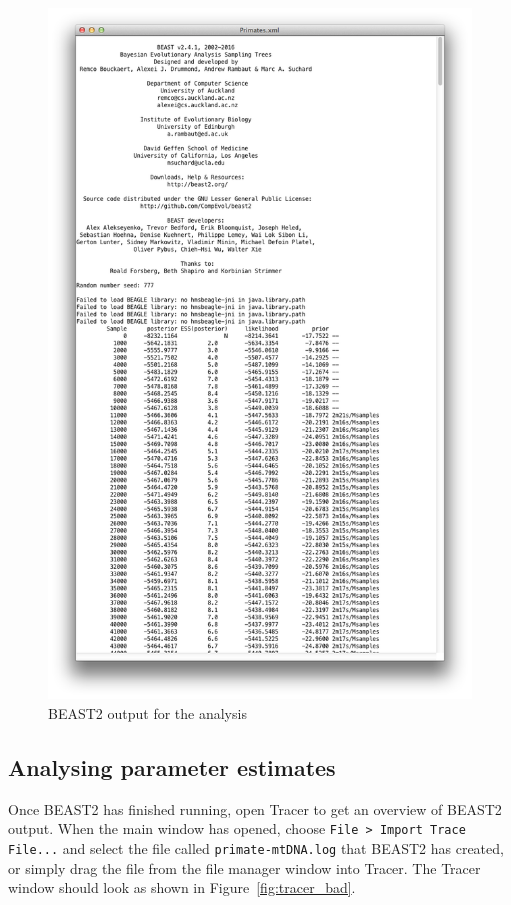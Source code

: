 \documentclass[11pt]{article}
\begin{document}
\begin{figure}[H]
\centering
\includegraphics[width=5in]{figures/beast_out.png}
\caption{\small BEAST2 output for the analysis}
\label{fig:beast_out}
\end{figure}

\subsection{Analysing parameter estimates}

Once BEAST2 has finished running, open Tracer to get an overview of BEAST2 output. When the main window has opened, choose \texttt{File > Import Trace File...} and select the file called \texttt{primate-mtDNA.log} that BEAST2 has created, or simply drag the file from the file manager window into Tracer. The Tracer window should look as shown in Figure~\ref{fig:tracer_bad}.
\end{document}
